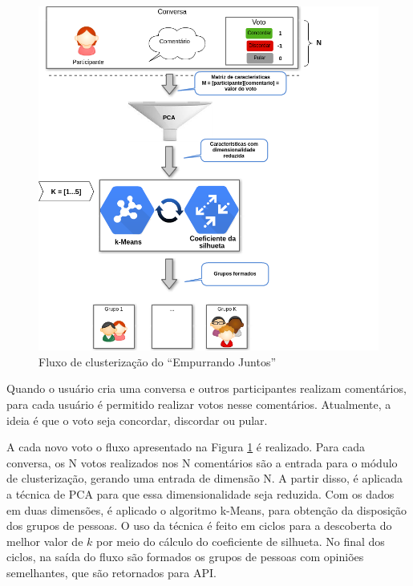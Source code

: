     \begin{figure}[h!]
      \centering
      \includegraphics[scale=0.7]{figuras/resumo_clusterizao_ej.png}
      \caption{Fluxo de clusterização do ``Empurrando Juntos''}
      \label{fig:resumo_clusterizao_ej}
    \end{figure}

    Quando o usuário cria uma conversa e outros participantes realizam comentários, para cada usuário é permitido realizar votos nesse comentários.
    Atualmente, a ideia é que o voto seja concordar, discordar ou pular. 

    A cada novo voto o fluxo apresentado na Figura \ref{fig:resumo_clusterizao_ej} é
    realizado.
    Para cada conversa, os N votos realizados nos N comentários são a entrada para o módulo de clusterização, 
    gerando uma entrada de dimensão N. A partir disso, é aplicada a técnica de PCA para que
    essa dimensionalidade seja reduzida. Com os dados em duas dimensões, é aplicado o algoritmo k-Means,
    para obtenção da disposição dos grupos de pessoas. O uso da técnica é
    feito em ciclos para a descoberta do melhor valor de $k$ por meio do cálculo do coeficiente de silhueta.
    No final dos ciclos, na saída do fluxo são formados os grupos de pessoas com opiniões semelhantes, que são retornados para API.